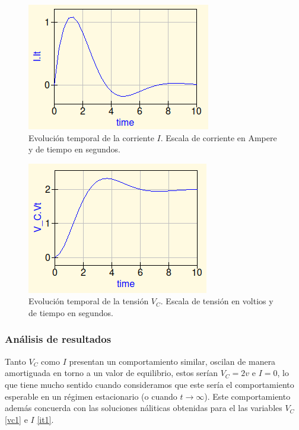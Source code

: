 \documentclass[letterpaper,12pt]{article} %
\begin{document}
\begin{figure}[h]
\includegraphics[scale=0.8]{ig.png}
\centering
\caption{Evolución temporal de la corriente $I$. Escala de corriente en Ampere y de tiempo en segundos.}
\label{fig:ig}
\end{figure} \newpage
\begin{figure}[h]
\includegraphics[scale=0.8]{vcg.png}
\centering
\caption{Evolución temporal de la tensión $V_C$. Escala de tensión en voltios y de tiempo en segundos.}
\label{fig:vcg}
\end{figure}

\subsubsection*{Análisis de resultados}

Tanto $V_C$ como $I$ presentan un comportamiento similar, oscilan de manera amortiguada en torno a un valor de equilibrio, estos serían $V_C=2v$ e $I=0$, lo que tiene mucho sentido cuando consideramos que este sería el comportamiento esperable en un régimen estacionario (o cuando $t \longrightarrow \infty$). Este comportamiento además concuerda con las soluciones náliticas obtenidas para el las variables $V_C$ \eqref{vc1} e $I$ \eqref{it1}.
\end{document}
